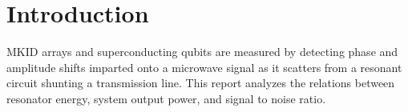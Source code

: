 \section{Introduction}

MKID arrays and superconducting qubits are measured by detecting phase and amplitude shifts imparted onto a microwave signal as it scatters from a resonant circuit shunting a transmission line.
This report analyzes the relations between resonator energy, system output power, and signal to noise ratio.
